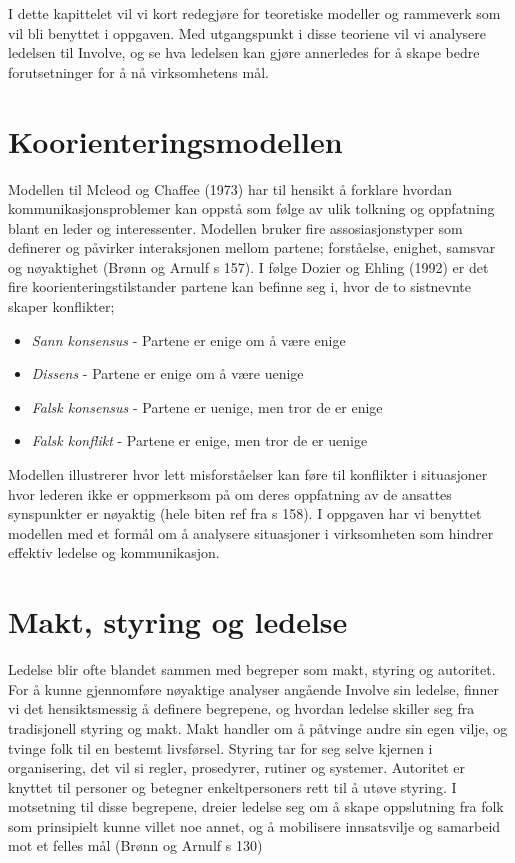 I dette kapittelet vil vi kort redegjøre for teoretiske modeller og rammeverk som vil bli benyttet i oppgaven. Med utgangspunkt i disse teoriene vil vi analysere ledelsen til Involve, og se hva ledelsen kan gjøre annerledes for å skape bedre forutsetninger for å nå virksomhetens mål.

\section{Koorienteringsmodellen}
Modellen til Mcleod og Chaffee (1973) har til hensikt å forklare hvordan kommunikasjonsproblemer kan oppstå som følge av ulik tolkning og oppfatning blant en leder og interessenter. Modellen bruker fire assosiasjonstyper som definerer og påvirker interaksjonen mellom partene; forståelse, enighet, samsvar og nøyaktighet (Brønn og Arnulf s 157). I følge Dozier og Ehling (1992) er det fire koorienteringstilstander partene kan befinne seg i, hvor de to sistnevnte skaper konflikter;

\begin{itemize}
\item\textit{Sann konsensus} - Partene er enige om å være enige
\item\textit{Dissens} - Partene er enige om å være uenige
\item\textit{Falsk konsensus} - Partene er uenige, men tror de er enige
\item\textit{Falsk konflikt} - Partene er enige, men tror de er uenige
\end{itemize}

Modellen illustrerer hvor lett misforståelser kan føre til konflikter i situasjoner hvor lederen ikke er oppmerksom på om deres oppfatning av de ansattes synspunkter er nøyaktig (hele biten ref fra s 158). I oppgaven har vi benyttet modellen med et formål om å analysere situasjoner i virksomheten som hindrer effektiv ledelse og kommunikasjon.

\section{Makt, styring og ledelse}
Ledelse blir ofte blandet sammen med begreper som makt, styring og autoritet. For å kunne gjennomføre nøyaktige analyser angående Involve sin ledelse, finner vi det hensiktsmessig å definere begrepene, og hvordan ledelse skiller seg fra tradisjonell styring og makt. Makt handler om å påtvinge andre sin egen vilje, og tvinge folk til en bestemt livsførsel. Styring tar for seg selve kjernen i organisering, det vil si regler, prosedyrer, rutiner og systemer. Autoritet er knyttet til personer og betegner enkeltpersoners rett til å utøve styring. I motsetning til disse begrepene, dreier ledelse seg om å skape oppslutning fra folk som prinsipielt kunne villet noe annet, og å mobilisere innsatsvilje og samarbeid mot et felles mål (Brønn og Arnulf s 130)

